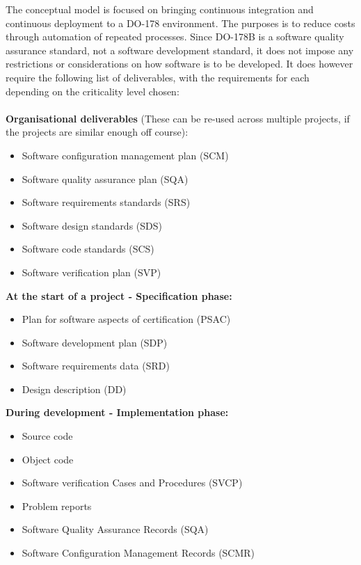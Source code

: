 \documentclass{sig-alternate-05-2015}
\begin{document}
The conceptual model is focused on bringing continuous integration and continuous deployment to a DO-178 environment. The purposes is to reduce costs through automation of repeated processes. Since DO-178B is a software quality assurance standard, not a software development standard, it does not impose any restrictions or considerations on how software is to be developed. It does however require the following list of deliverables, with the requirements for each depending on the criticality level chosen:
\\
\\
\textbf{Organisational deliverables}
(These can be re-used across multiple projects, if the projects are similar enough off course):

\begin{itemize}
	\item Software configuration management plan (SCM)
	\item Software quality assurance plan (SQA)
	\item Software requirements standards (SRS)
	\item Software design standards (SDS)
	\item Software code standards (SCS)
	\item Software verification plan (SVP)
\end{itemize}

\hfill \break
\textbf{At the start of a project - Specification phase:}

\begin{itemize}
	\item Plan for software aspects of certification (PSAC)
	\item Software development plan (SDP)
	\item Software requirements data (SRD)
	\item Design description (DD)
\end{itemize}

\hfill \break
\textbf{During development - Implementation phase:}

\begin{itemize}
	\item Source code
	\item Object code
	\item Software verification Cases and Procedures (SVCP)
	\item Problem reports
	\item Software Quality Assurance Records (SQA)
	\item Software Configuration Management Records (SCMR)
\end{itemize}
\end{document}
